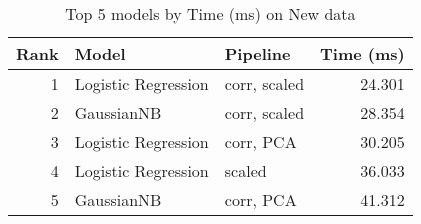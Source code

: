 \begin{table}[!htb]
\centering
\begin{tabular}{rllr}
\toprule
Rank & Model & Pipeline & Time (ms) \\
\midrule
1 & Logistic Regression & corr, scaled & 24.301 \\
2 & GaussianNB & corr, scaled & 28.354 \\
3 & Logistic Regression & corr, PCA & 30.205 \\
4 & Logistic Regression & scaled & 36.033 \\
5 & GaussianNB & corr, PCA & 41.312 \\
\bottomrule
\end{tabular}
\caption{Top 5 models by Time (ms) on New data}
\label{table-top-5-time-(ms)-new}
\end{table}
